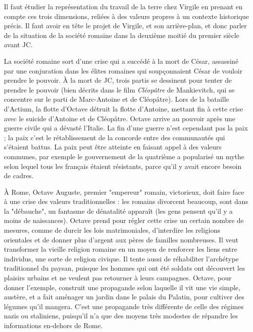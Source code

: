 \documentclass[a4paper,12pt]{book}
\begin{document}
Il faut étudier la représentation du travail de la terre chez Virgile en prenant en compte ces trois dimensions, reliées à des valeurs propres à un contexte historique précis. Il faut avoir en tête le projet de Virgile, et son arrière-plan, et donc parler de la situation de la société romaine dans la deuxième moitié du premier siècle avant JC.
\par La société romaine sort d'une crise qui a succédé à la mort de César, assassiné par une conjuration dans les élites romaines qui soupçonnaient César de vouloir prendre le pouvoir. À la mort de JC, trois partis se dessinent pour tenter de prendre le pouvoir (bien décrits dans le film \textit{Cléopâtre} de Mankievitch, qui se concentre sur le parti de Marc-Antoine et de Cléopâtre). Lors de la bataille d'Actium, la flotte d'Octave détruit la flotte d'Antoine, mettant fin à cette crise avec le suicide d'Antoine et de Cléopâtre. Octave arrive au pouvoir après une guerre civile qui a dévasté l'Italie. La fin d'une guerre n'est cependant pas la paix ; la paix c'est le rétablissement de la concorde entre des communautés qui s'étaient battus. La paix peut être atteinte en faisant appel à des valeurs communes, par exemple le gouvernement de la quatrième a popularisé un mythe selon lequel tous les français étaient résistants, parce qu'il y avait encore besoin de cadres.
\par À Rome, Octave Auguste, premier "empereur" romain, victorieux, doit faire face à une crise des valeurs traditionnelles : les romains divorcent beaucoup, sont dans la "débauche", un fantasme de dénatalité apparaît (les gens pensent qu'il y a moins de naissances). Octave prend pour régler cette crise un certain nombre de mesures, comme de durcir les lois matrimoniales, d'interdire les religions orientales et de donner plus d'argent aux pères de familles nombreuses. Il veut transformer la vieille religion romaine en un moyen de renforcer les liens entre individus, une sorte de religion civique. Il tente aussi de réhabiliter l'archétype traditionnel du paysan, puisque les hommes qui ont été soldats ont découvert les plaisirs urbains et ne veulent pas retourner à leurs campagnes. Octave, pour donner l'exemple, construit une propagande selon laquelle il vit une vie simple, austère, et a fait aménager un jardin dans le palais du Palatin, pour cultiver des légumes qu'il mangera. C'est une propagande très différente de celle des régimes nazis ou staliniens, puisqu'il n'a que des moyens très modestes de répandre les informations en-dehors de Rome.
\end{document}
